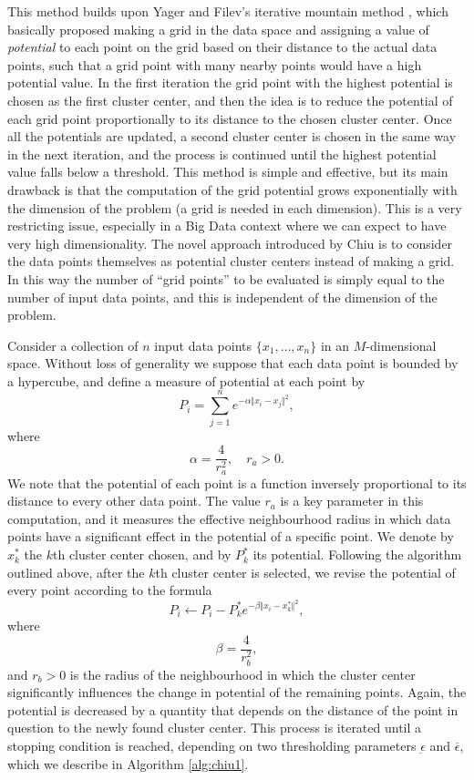 This method builds upon Yager and Filev's iterative mountain method \cite{yager1994approximate}, which basically proposed making a grid in the data space and assigning a value of \textit{potential} to each point on the grid based on their distance to the actual data points, such that a grid point with many nearby points would have a high potential value. In the first iteration the grid point with the highest potential is chosen as the first cluster center, and then the idea is to reduce the potential of each grid point proportionally to its distance to the chosen cluster center. Once all the potentials are updated, a second cluster center is chosen in the same way in the next iteration, and the process is continued until the highest potential value falls below a threshold. This method is simple and effective, but its main drawback is that the computation of the grid potential grows exponentially with the dimension of the problem (a grid is needed in each dimension). This is a very restricting issue, especially in a Big Data context where we can expect to have very high dimensionality. The novel approach introduced by Chiu is to consider the data points themselves as potential cluster centers instead of making a grid. In this way the number of ``grid points'' to be evaluated is simply equal to the number of input data points, and this is independent of the dimension of the problem.

Consider a collection of $n$ input data points $\{x_1,\dots,x_n\}$ in an $M$-dimensional space. Without loss of generality we suppose that each data point is bounded by a hypercube, and define a measure of potential at each point by
\begin{equation} \label{eq:chiu-pot}
P_i = \sum_{j=1}^n e^{-\alpha \Vert x_i-x_j \Vert^2},
\end{equation}
where
\[
\alpha = \frac{4}{r_a^2}, \quad r_a > 0.
\]
We note that the potential of each point is a function inversely proportional to its distance to every other data point. The value $r_a$ is a key parameter in this computation, and it measures the effective neighbourhood radius in which data points have a significant effect in the potential of a specific point. We denote by $x_k^\ast$ the $k$th cluster center chosen, and by $P_k^\ast$ its potential. Following the algorithm outlined above, after the $k$th cluster center is selected, we revise the potential of every point according to the formula
\[
P_i \leftarrow P_i - P_k^\ast e^{-\beta \Vert x_i - x_k^\ast \Vert^2},
\]
where
\[
\beta = \frac{4}{r_b^2},
\]
and $r_b>0$ is the radius of the neighbourhood in which the cluster center significantly influences the change in potential of the remaining points. Again, the potential is decreased by a quantity that depends on the distance of the point in question to the newly found cluster center. This process is iterated until a stopping condition is reached, depending on two thresholding parameters $\underbar{\epsilon}$ and $\overbar{\epsilon}$, which we describe in Algorithm \ref{alg:chiu1}.

